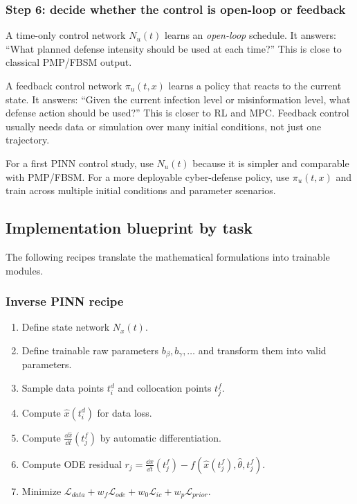\documentclass[11pt,a4paper]{article}
\begin{document}
\subsubsection*{Step 6: decide whether the control is open-loop or feedback}
A time-only control network $N_u(t)$ learns an \emph{open-loop} schedule. It answers: ``What planned defense intensity should be used at each time?'' This is close to classical PMP/FBSM output.

A feedback control network $\pi_u(t,x)$ learns a policy that reacts to the current state. It answers: ``Given the current infection level or misinformation level, what defense action should be used?'' This is closer to RL and MPC. Feedback control usually needs data or simulation over many initial conditions, not just one trajectory.

\begin{takeaway}
For a first PINN control study, use $N_u(t)$ because it is simpler and comparable with PMP/FBSM. For a more deployable cyber-defense policy, use $\pi_u(t,x)$ and train across multiple initial conditions and parameter scenarios.
\end{takeaway}

\subsection{Implementation blueprint by task}
The following recipes translate the mathematical formulations into trainable modules.

\subsubsection*{Inverse PINN recipe}
\begin{enumerate}[leftmargin=2em]
    \item Define state network $N_x(t)$.
    \item Define trainable raw parameters $b_\beta,b_\gamma,\ldots$ and transform them into valid parameters.
    \item Sample data points $t_i^d$ and collocation points $t_j^f$.
    \item Compute $\hat{x}(t_i^d)$ for data loss.
    \item Compute $\frac{\dd \hat{x}}{\dd t}(t_j^f)$ by automatic differentiation.
    \item Compute ODE residual $r_j=\frac{\dd \hat{x}}{\dd t}(t_j^f)-f(\hat{x}(t_j^f),\hat{\theta},t_j^f)$.
    \item Minimize $\mathcal{L}_{data}+w_f\mathcal{L}_{ode}+w_0\mathcal{L}_{ic}+w_p\mathcal{L}_{prior}$.
\end{enumerate}
\end{document}
